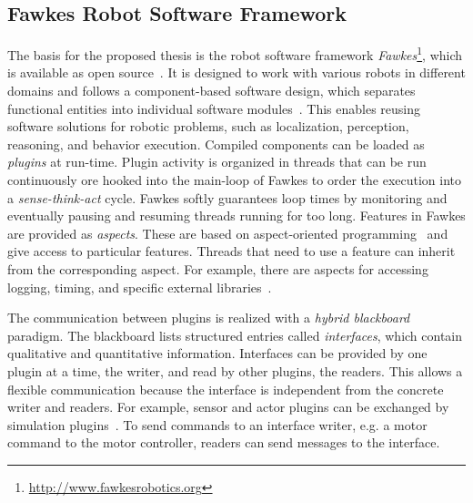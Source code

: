 \documentclass[a4paper,11pt]{article}
\begin{document}
\subsection{Fawkes Robot Software Framework}
\label{sec:fawkes}
The basis for the proposed thesis is the robot software framework
\emph{Fawkes}\footnote{\url{http://www.fawkesrobotics.org}}, which is
available as open source~\cite{FawkesDesign,Fawkes-RCLL-2014}.
It is designed to work with
various robots in different domains and follows a component-based
software design, which separates functional entities into individual
software modules~\cite{component}. This enables reusing
software solutions for robotic problems, such as localization,
perception, reasoning, and behavior execution. Compiled
components can be loaded as \emph{plugins} at run-time.
%
Plugin activity is organized in threads
that can be run continuously ore hooked into
the main-loop of Fawkes to order the execution into a
\emph{sense-think-act} cycle.
Fawkes softly guarantees loop times by
monitoring and eventually pausing and resuming threads running for too
long.
Features in Fawkes are provided as \textit{aspects}. These are
based on aspect-oriented programming~\cite{aspect_oriented} and give
access to particular features. Threads that need to use a feature can
inherit from the corresponding aspect. For example, there are aspects
for accessing logging, timing, and specific external libraries~\cite{tnthesis}.

The communication between plugins is realized with a \emph{hybrid blackboard}
paradigm. The blackboard lists structured entries called
\emph{interfaces}, which contain qualitative and quantitative information.
Interfaces can be
provided by one plugin at a time, the writer, and read by other
plugins, the readers. This allows a flexible communication
because the interface is independent from the concrete writer and readers.
For example, sensor and actor plugins can be exchanged by simulation
plugins~\cite{LLSF-Sim}.
To send commands to an interface writer, e.g. a
motor command to the motor controller, readers can send messages to
the interface.
\end{document}
